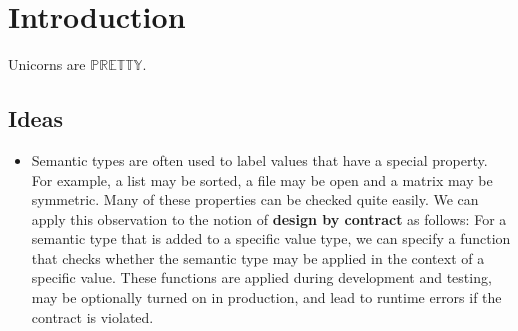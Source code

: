 \chapter{Introduction}

Unicorns are $\mathbb{PRETTY}$.


\section{Ideas}

\begin{itemize}
  \item Semantic types are often used to label values that have a special property. For example, a list may be sorted, a file may be open and a matrix may be symmetric. Many of these properties can be checked quite easily. We can apply this observation to the notion of \textbf{design by contract} as follows: For a semantic type that is added to a specific value type, we can specify a function that checks whether the semantic type may be applied in the context of a specific value. These functions are applied during development and testing, may be optionally turned on in production, and lead to runtime errors if the contract is violated.
\end{itemize}
